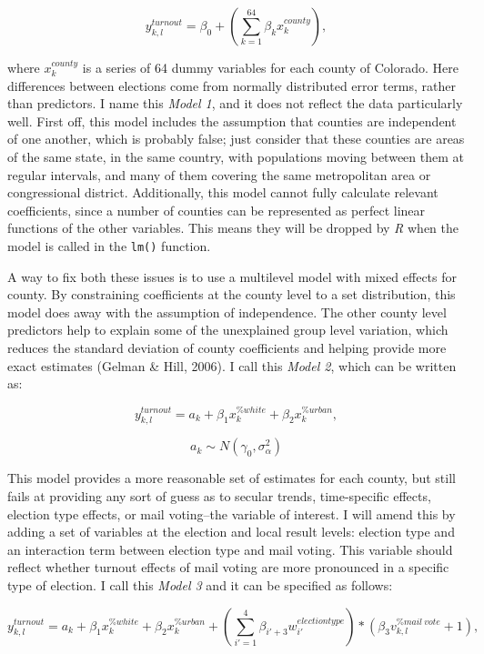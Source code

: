 \documentclass[12pt,twoside]{reedthesis}
\begin{document}
  \[y^{turnout}_{k,l} = \beta_0 + (\sum_{k=1}^{64}\beta_kx_k^{county}),\]
  
  where \(x_k^{county}\) is a series of 64 dummy variables for each county
  of Colorado. Here differences between elections come from normally
  distributed error terms, rather than predictors. I name this \emph{Model
  1}, and it does not reflect the data particularly well. First off, this
  model includes the assumption that counties are independent of one
  another, which is probably false; just consider that these counties are
  areas of the same state, in the same country, with populations moving
  between them at regular intervals, and many of them covering the same
  metropolitan area or congressional district. Additionally, this model
  cannot fully calculate relevant coefficients, since a number of counties
  can be represented as perfect linear functions of the other variables.
  This means they will be dropped by \textit{R} when the model is called
  in the \texttt{lm()} function.
  
  A way to fix both these issues is to use a multilevel model with mixed
  effects for county. By constraining coefficients at the county level to
  a set distribution, this model does away with the assumption of
  independence. The other county level predictors help to explain some of
  the unexplained group level variation, which reduces the standard
  deviation of county coefficients and helping provide more exact
  estimates (Gelman \& Hill, 2006). I call this \emph{Model 2}, which can
  be written as:
  
  \[y^{turnout}_{k,l} = a_{k} + \beta_{1}x_k^{\%white} + \beta_{2}x_k^{\%urban},\]
  
  \[a_{k} \sim N (\gamma_0, \sigma_{\alpha}^2)\]
  
  This model provides a more reasonable set of estimates for each county,
  but still fails at providing any sort of guess as to secular trends,
  time-specific effects, election type effects, or mail voting--the
  variable of interest. I will amend this by adding a set of variables at
  the election and local result levels: election type and an interaction
  term between election type and mail voting. This variable should reflect
  whether turnout effects of mail voting are more pronounced in a specific
  type of election. I call this \emph{Model 3} and it can be specified as
  follows:
  
  \[y^{turnout}_{k,l} = a_{k} + \beta_{1}x_k^{\% white} + \beta_{2}x_k^{\% urban} + (\sum_{i'=1}^{4}\beta_{i'+3}w_{i'}^{election type})*(\beta_3v_{k,l}^{\% mail~vote} + 1),\]
  
\end{document}
